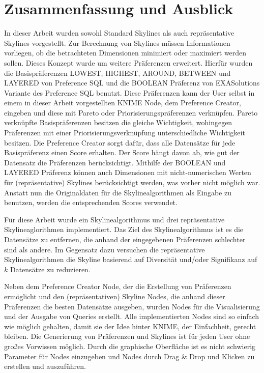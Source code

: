 \chapter{Zusammenfassung und Ausblick}
\label{ch:Zusammenfassung}
In dieser Arbeit wurden sowohl Standard Skylines als auch repräsentative Skylines vorgestellt. Zur Berechnung von Skylines müssen Informationen vorliegen, ob die betrachteten Dimensionen minimiert oder maximiert werden sollen. Dieses Konzept wurde um weitere Präferenzen erweitert. Hierfür wurden die Basispräferenzen LOWEST, HIGHEST, AROUND, BETWEEN und LAYERED von Preference SQL und die BOOLEAN Präferenz von EXASolutions Variante des Preference SQL benutzt. 
Diese Präferenzen kann der User selbst in einem in dieser Arbeit vorgestellten KNIME Node, dem Preference Creator, eingeben und diese mit Pareto oder Priorisierungspräferenzen verknüpfen. Pareto verknüpfte Basispräferenzen besitzen die gleiche Wichtigkeit, wohingegen Präferenzen mit einer Priorisierungsverknüpfung unterschiedliche Wichtigkeit besitzen. Die Preference Creator sorgt dafür, dass alle Datensätze für jede Basispräferenz einen Score erhalten. Der Score hängt davon ab, wie gut der Datensatz die Präferenzen berücksichtigt. 
Mithilfe der BOOLEAN und LAYERED Präferenz können auch Dimensionen mit nicht-numerischen Werten für (repräsentative) Skylines berücksichtigt werden, was vorher nicht möglich war.  
Anstatt nun die Originaldaten für die Skylinealgorithmen als Eingabe zu benutzen, werden die entsprechenden Scores verwendet.

Für diese Arbeit wurde ein Skylinealgorithmus und drei repräsentative Skylineaglorithmen implementiert. Das Ziel des Skylinealgorithmus ist es die Datensätze zu entfernen, die anhand der eingegebenen Präferenzen schlechter sind als andere. Im Gegensatz dazu versuchen die repräsentative Skylinealgorithmen die Skyline basierend auf Diversität und/oder Signifikanz auf $k$ Datensätze zu reduzieren.

Neben dem Preference Creator Node, der die Erstellung von Präferenzen ermöglicht und den (repräsentativen) Skyline Nodes, die anhand dieser Präferenzen die besten Datensätze ausgeben, wurden Nodes für die Visualisierung und der Ausgabe von Queries erstellt. Alle implementierten Nodes sind so einfach wie möglich gehalten, damit sie der Idee hinter KNIME, der Einfachheit, gerecht bleiben. Die Generierung von Präferenzen und Skylines ist für jeden User ohne großes Vorwissen möglich. Durch die graphische Oberfläche ist es nicht schwierig Parameter für Nodes einzugeben und Nodes durch Drag \& Drop und Klicken zu erstellen und auszuführen.  

